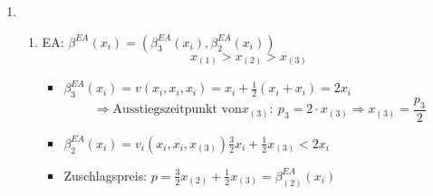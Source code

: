 \documentclass[12pt]{extreport} %
\theoremstyle{named}
\theoremstyle{itshape}
\theoremstyle{normal}
\begin{document}
\begin{enumerate}
\begin{proof}
\begin{enumerate}
					$$ \beta^{SA}(x_{i}) = w(x_{i}, x_{i}) = x_{i} + \frac{1}{2} \Big( x_{i} + \mathds{E}\big[ X_{(4)} \big| \underbrace{X_{(2)} = x_{i}}_{\overset{preisbestimmendes}{Signal}} \big] \Big) $$
					Grafisch:
					;
    				    				~\\
					Damit folgt:
					$$ \beta^{SA}(x_{i}) = x_{i} +\frac{1}{2} \left( x_{i} + \frac{x_{i}}{2} \right) = \frac{7}{4} x_{i} $$ ~\\
				\item $\mathds{E}\left[p^{SA}\right] = \mathds{E} \left[ \beta^{SA} \left( X_{(2,3)}\right) \right]  = \frac{7}{4}  \underbrace{\mathds{E} \left[  \left( X_{(2,3)}\right) \right]}_{\overset{\text{mit}}{\mathds{E}\left[X_{(k,n)}\right] = \frac{n-k+1}{n+1}}}  = \frac{7}{4} \cdot \frac{1}{2} = \frac{7}{8}$
				\item Als Beispiel für den Winners-Curse: $x_{1} = 0.9$, $x_{2} = 0.8$, $x_{3} = 0$
					$$ \Rightarrow v_{1} = 0.9 + \frac{1}{2} \left( 0.8 + 0 \right) = 1.3 $$
					Allerdings ist das zu zahlende Gebot, das Gebot von $i = 2$ und das lautet:
					$$ b_{2} = \beta^{SA}(x_{2}) = 0.8 + \frac{1}{2} \left( 0.8 + 0.4 \right) = 1.4, $$
					und damit ist $v_1 < p$ also der winners-curse tritt auf.
			\end{enumerate}
		\end{proof}
	\item \begin{enumerate}
			\item EA: $\beta^{EA}(x_{i}) = \left( \beta_{3}^{EA}(x_{i}), \beta_{2}^{EA}(x_{i}) \right)$ 
				$$ x_{(1)} > x_{(2)} > x_{(3)} $$
	 			\begin{itemize}
	 				\item $\beta_{3}^{EA}(x_{i}) = v(x_{i}, x_{i}, x_{i}) = x_{i} + \frac{1}{2} \left( x_{i} + x_{i} \right) = 2 x_{i}$
	 					$$ \Rightarrow \text{Ausstiegszeitpunkt von} x_{(3)}: ~ p_{3} = 2 \cdot x_{(3)} \Rightarrow x_{(3)} = \frac{p_{3}}{2}$$
	 				\item $\beta_{2}^{EA}(x_{i}) = v_{i}\left(x_{i}, x_{i}, x_{(3)} \right) \frac{3}{2} x_{i} + \frac{1}{2} x_{(3)} < 2 x_{i}$
	 				\item Zuschlagspreis: $p = \frac{3}{2} x_{(2)} + \frac{1}{2} x_{(3)} = \beta_{(2)}^{EA}(x_{i})$
	 			\end{itemize}

\end{enumerate}
\end{enumerate}
\end{document}
